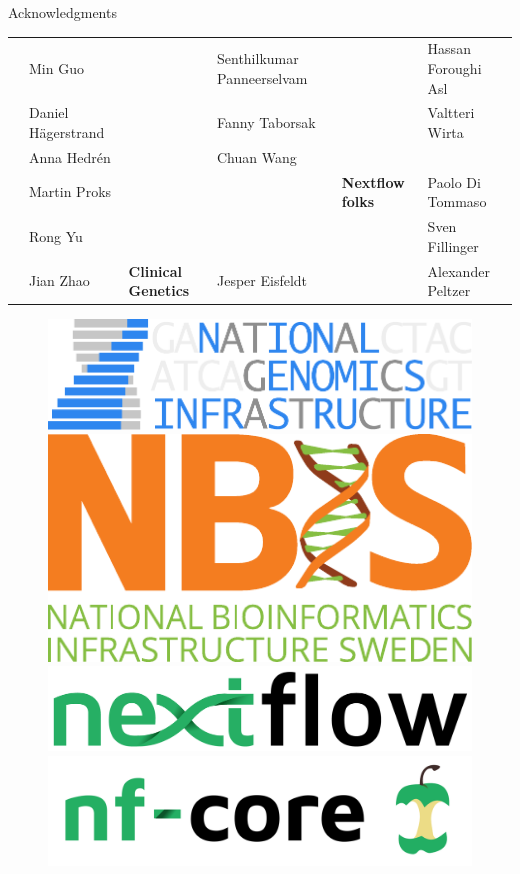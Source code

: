 \documentclass[usepdftitle=false]{beamer}
\begin{document}
\begin{frame}{Acknowledgments}
\begin{table}
{\begin{tabular}{llllll}
													&	Min Guo							&														&	Senthilkumar Panneerselvam	&															&	Hassan Foroughi Asl\\
													&	Daniel Hägerstrand	&														&	Fanny Taborsak							&															&	Valtteri Wirta\\
													&	Anna Hedrén					&														&	Chuan Wang									&															&	\\
													&	Martin Proks				&									&							&	\textbf{Nextflow folks}	&	Paolo Di Tommaso	\\
													&	Rong Yu							&									&							&													&	Sven Fillinger	\\
													&	Jian Zhao						&	\textbf{Clinical Genetics}		&	Jesper Eisfeldt			&		&	Alexander Peltzer	\\
		\end{tabular}}
	\end{table}
	\begin{figure}
		\includegraphics[height=.6cm]{pictures/NGI}%
		\hfill%
		\includegraphics[height=.6cm]{pictures/NBIS}%
		\hfill%
		\includegraphics[height=.6cm]{pictures/nextflow.png}%
		\hfill%
		\includegraphics[height=.6cm]{pictures/nf-core-logo}%
	\end{figure}
\end{frame}
\end{document}
